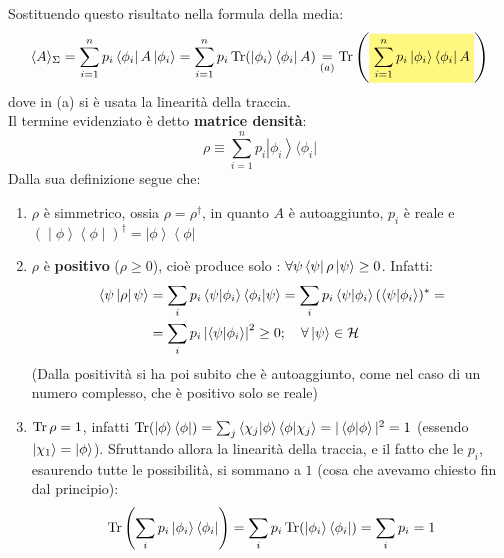 \documentclass[../../FisicaTeorica.tex]{subfiles}
\begin{document}
Sostituendo questo risultato nella formula della media:
\begin{equation}
\langle A \rangle_\Sigma = \sum_{i=1}^n p_i \bra{\phi_i}A\ket{\phi_i} = \sum_{i=1}^n p_i \op{Tr}(\ket{\phi_i}\bra{\phi_i}A) \underset{(a)}{=} \op{Tr}\left( \hlc{Yellow}{\sum_{i=1}^n p_i \ket{\phi_i}\bra{\phi_i}A}\right )
\label{eqn:media_stati_misti}
\end{equation}
dove in (a) si è usata la linearità della traccia.\\
Il termine evidenziato è detto \textbf{matrice densità}:
\[
\rho \equiv \sum_{i=1}^{n}{p_i\left|\phi_i\right\rangle\langle\phi_i|}
\]
Dalla sua definizione segue che: 
\begin{enumerate}
    \item $\rho$ è simmetrico, ossia $\displaystyle \rho = \rho^\dag$, in quanto $A$ è autoaggiunto, $p_i$ è reale e $\left(\middle|\phi\right\rangle{\left\langle\phi\middle|\right)}^\dag=\left|\phi\right\rangle\left\langle\phi\right|$
	\item $\rho$ è \textbf{positivo} ($\rho \geq 0$), cioè produce solo : $\forall \psi \left\langle\psi\right|\rho \ket{\psi}\geq 0$. Infatti:
	\begin{align*}
	    \left\langle\psi\left|\rho\right|\psi\right\rangle&=\sum_{i}p_i\left\langle\psi\middle|\phi_i\right\rangle\left\langle\phi_i\middle|\psi\right\rangle=
	    \sum_i p_i \braket{\psi|\phi_i}(\braket{\psi|\phi_i})^* =
	    \\
	    &=\sum_{i}p_i\left|\left\langle\psi\middle|\phi_i\right\rangle\right|^2\geq0; \quad \forall \ket{\psi}\in \mathcal{H}
	\end{align*}
	(Dalla positività si ha poi subito che è autoaggiunto, come nel caso di un numero complesso, che è positivo solo se reale)
	\item $\displaystyle \operatorname{Tr}\rho = 1$, infatti  $\operatorname{Tr}(\ket{\phi}\bra{\phi}) = \sum_j \braket{\chi_j|\phi}\braket{\phi|\chi_j} = |\braket{\phi|\phi}|^2 = 1$ (essendo $\ket{\chi_1} = \ket{\phi}$). Sfruttando allora la linearità della traccia, e il fatto che le $p_i$, esaurendo tutte le possibilità, si sommano a $1$ (cosa che avevamo chiesto fin dal principio):
	\[
	\operatorname{Tr}\left(\sum_i p_i \ket{\phi_i}\bra{\phi_i}\right) = \sum_i p_i \operatorname{Tr}(\ket{\phi_i}\bra{\phi_i}) = \sum_i p_i = 1
	\]
\end{enumerate}
\end{document}

